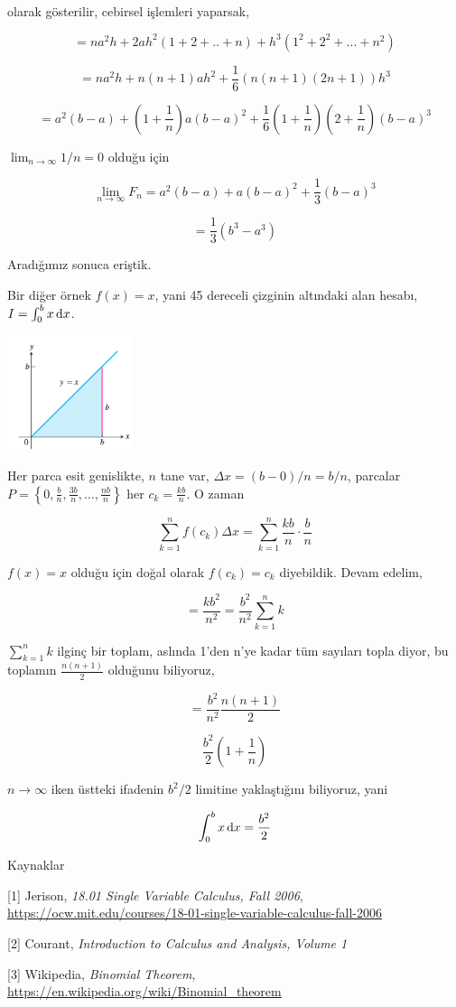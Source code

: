 \documentclass[12pt,fleqn]{article}\usepackage{../../common}
\begin{document}
olarak gösterilir, cebirsel işlemleri yaparsak,

$$
= na^2 h + 2ah^2 (1+2+..+n) + h^3 (1^2+2^2+...+n^2)
$$

$$
= na^2h + n(n+1)ah^2 + \frac{1}{6} (n(n+1)(2n+1))h^3
$$

$$
= a^2 (b-a) + (1+\frac{1}{n})a (b-a)^2 +
  \frac{1}{6} (1+\frac{1}{n})(2+\frac{1}{n})(b-a)^3
$$

$\lim_{n\to\infty} 1/n = 0$ olduğu için

$$
\lim_{n\to\infty} F_n = a^2(b-a) + a(b-a)^2 + \frac{1}{3} (b-a)^3 
$$

$$
= \frac{1}{3} (b^3 - a^3)
$$

Aradığımız sonuca eriştik.

Bir diğer örnek $f(x) = x$, yani 45 dereceli çizginin altındaki alan hesabı,
$I = \int_{0}^{b} x \,\mathrm{d} x$.

\includegraphics[width=10em]{ode_mattuck_94_int_01.png}

Her parca esit genislikte, $n$ tane var, $\Delta x = (b - 0) / n = b/n$,
parcalar $P = \left\{ 0, \frac{b}{n}, \frac{3b}{n}, ..., \frac{nb}{n}
\right\}$ her $c_k = \frac{kb}{n}$. O zaman 

$$ 
\sum_{k=1}^{n} f(c_k) \Delta x = \sum_{k=1}^{n} \frac{kb}{n} \cdot \frac{b}{n}
$$

$f(x) = x$ olduğu için doğal olarak $f(c_k)=c_k$ diyebildik. Devam edelim, 

$$ 
= \frac{kb^2}{n^2} = \frac{b^2}{n^2} \sum_{k=1}^{n} k
$$

$\sum_{k=1}^{n} k$ ilginç bir toplam, aslında 1'den n'ye kadar tüm
sayıları topla diyor, bu toplamın $\frac{n(n+1)}{2}$ olduğunu biliyoruz, 

$$ 
= \frac{b^2}{n^2} \frac{n(n+1)}{2}
$$

$$ 
\frac{b^2}{2} (1 + \frac{1}{n})
$$

$n \to \infty$ iken üstteki ifadenin $b^2/2$ limitine yaklaştığını
biliyoruz, yani

$$ 
\int_{0}^{b} x \,\mathrm{d} x = \frac{b^2}{2}
$$


Kaynaklar

[1] Jerison, {\em 18.01 Single Variable Calculus, Fall 2006},
    \url{https://ocw.mit.edu/courses/18-01-single-variable-calculus-fall-2006}

[2] Courant, {\em Introduction to Calculus and Analysis, Volume 1}

[3] Wikipedia, {\em Binomial Theorem},
    \url{https://en.wikipedia.org/wiki/Binomial_theorem}
    
\end{document}
